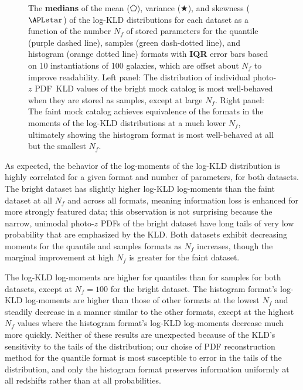 \documentclass[\docopts]{\docclass}
\newcommand{\pz}{photo-$z$ PDF}
\newcommand{\mgdata}{bright\xspace}
\newcommand{\ssdata}{faint\xspace}
\begin{document}
\begin{figure}
\begin{center}
    \caption{
    The \textbf{medians} of the mean ($\pentagon$), variance ($\bigstar$), and 
skewness ($\APLstar$) of the log-KLD distributions for each dataset as a 
function of the number $N_{f}$ of stored parameters for the quantile (purple 
dashed line), samples (green dash-dotted line), and histogram (orange dotted 
line) formats with \textbf{IQR} error bars based on 10 instantiations of 100 
galaxies, which are offset about $N_{f}$ to improve readability.
    Left panel: The distribution of individual \pz\ KLD values of the \mgdata 
mock catalog is most well-behaved when they are stored as samples, except at 
large $N_{f}$.
    Right panel: The \ssdata mock catalog achieves equivalence of the formats 
in the moments of the log-KLD distributions at a much lower $N_{f}$, ultimately 
showing the histogram format is most well-behaved at all but the smallest 
$N_{f}$.
    \label{fig:kld_moments}}
  \end{center}
\end{figure}

As expected, the behavior of the log-moments of the log-KLD distribution is 
highly correlated for a given format and number of parameters, for both 
datasets.
The \mgdata dataset has slightly higher log-KLD log-moments than the \ssdata 
dataset at all $N_{f}$ and across all formats, meaning information loss is 
enhanced for more strongly featured data; this observation is not surprising 
because the narrow, unimodal \pz s of the \mgdata dataset have long tails of 
very low probability that are emphasized by the KLD.
Both datasets exhibit decreasing moments for the quantile and samples formats 
as $N_{f}$ increases, though the marginal improvement at high $N_{f}$ is 
greater for the \ssdata dataset.

The log-KLD log-moments are higher for quantiles than for samples for both 
datasets, except at $N_{f}=100$ for the \mgdata dataset.
The histogram format's log-KLD log-moments are higher than those of other 
formats at the lowest $N_{f}$ and steadily decrease in a manner similar to the 
other formats, except at the highest $N_{f}$ values where the histogram 
format's log-KLD log-moments decrease much more quickly.
Neither of these results are unexpected because of the KLD's sensitivity to the 
tails of the distribution; our choise of PDF reconstruction method for the 
quantile format is most susceptible to error in the tails of the distribution, 
and only the histogram format preserves information uniformly at all redshifts 
rather than at all probabilities.
\end{document}
